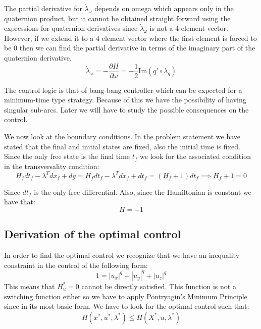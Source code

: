 The partial derivative for $\dot{\lambda}_\omega$ depends on omega which appears only in the quaternion product, but it cannot be obtained straight forward using the expressions for quaternion derivatives since $\dot{\lambda}_\omega$ is not a 4 element vector. However, if we extend it to a 4 element vector where the first element is forced to be 0 then we can find the partial derivative in terms of the imaginary part of the quaternion derivative.
\begin{equation}
\dot{\lambda}_\omega = - \frac{\partial H}{\partial \omega} = - \frac{1}{2} \text{Im}(q' \circ \lambda_q)
\end{equation}

The control logic is that of bang-bang controller which can be expected for a minimum-time type strategy. Because of this we have the possibility of having singular sub-arcs. Later we will have to study the possible consequences on the control.

We now look at the boundary conditions. In the problem statement we have stated that the final and initial states are fixed, also the initial time is fixed. Since the only free state is the final time $t_f$ we look for the associated condition in the transversality condition:
\begin{equation}
  H_f dt_f - \lambda^T dx_f + dg = H_f dt_f - \lambda^T dx_f + dt_f = (H_f + 1) dt_f \implies H_f + 1 = 0
\end{equation}

Since $dt_f$ is the only free differential. Also, since the Hamiltonian is constant we have that:
\begin{equation}
 H = -1
\end{equation}

\subsection{Derivation of the optimal control}

In order to find the optimal control we recognize that we have an inequality constraint in the control of the following form:
\begin{equation}
1 =  |u_x|^q + |u_y|^q + |u_z|^q
\end{equation}
This means that $H_u^*=0$ cannot be directly satisfied. This function is not a switching function either so we have to apply Pontryagin's Minimum Principle since in its most basic form. We have to look for the optimal control such that:
\begin{equation}
H(x^*, u^*, \lambda^*) \leq H(X^*, u, \lambda^*)
\end{equation}

